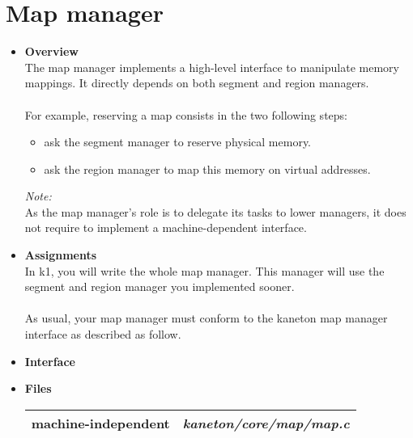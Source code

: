 %
%

\newpage

\section{Map manager}

\begin{itemize}
  \item {\bf Overview}\\
    The map manager implements a high-level interface to manipulate memory mappings.
    It directly depends on both segment and region managers.\\
    \\
    For example, reserving a map consists in the two following steps:
    \begin{itemize}
      \item ask the segment manager to reserve physical memory.
      \item ask the region manager to map this memory on virtual addresses.\\
    \end{itemize}

    {\em Note:}\\
    As the map manager's role is to delegate its tasks to lower managers, it does
    not require to implement a machine-dependent interface.\\

  \item {\bf Assignments}\\
    In k1, you will write the whole map manager. This manager will use the segment
    and region manager you implemented sooner.\\
    \\
    As usual, your map manager must conform to the kaneton map manager interface as
    described as follow.\\

  \item {\bf Interface}\\

  \item {\bf {Files}}\\

    \begin{tabular}{| l | l |}
      \hline
      machine-independent & {\em kaneton/core/map/map.c}\\\hline
    \end{tabular}
\end{itemize}

